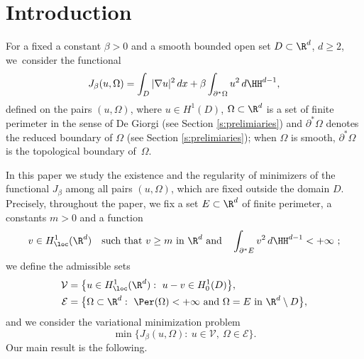 \section{Introduction}\label{s:intro}
For a fixed a constant $\beta>0$ and a smooth bounded open set $D\subset \R^d$, $d\ge 2$, we~consider the functional
\[J_\beta(u,\Omega)=\int_D|\nabla u|^2\,dx+\beta\int_{\partial^\ast \Omega}u^2\,d\HH^{d-1},\]
defined on the pairs $(u,\Omega)$, where $u\in H^1(D)$, $\Omega\subset\R^d$ is a set of finite perimeter in the sense of De Giorgi (see Section \ref{s:prelimiaries})
and $\partial^\ast\Omega$ denotes the reduced boundary of $\Omega$ (see Section \ref{s:prelimiaries}); when $\Omega$ is smooth, $\partial^\ast\Omega$ is the topological boundary of~$\Omega$.

In this paper we study the existence and the regularity of minimizers of the functional $J_\beta$
among all pairs $(u,\Omega)$, which are fixed outside the domain $D$. Precisely, throughout the paper, we fix a set $E\subset\R^d$ of finite perimeter, a constants $m>0$ and a function
\[v\in H^1_{\loc}(\R^d)\quad\text{such that $v\ge m$ in $\R^d$ and}\quad\int_{\partial^\ast E}v^2\,d\HH^{d-1}<+\infty\ ;\]
we define the admissible sets
\begin{align*}
\mathcal V&=\big\{u\in H^1_{\loc}(\R^d):\ u-v\in H^1_0(D)\big\},\\
\mathcal E&=\big\{\Omega\subset\R^d:\ \Per(\Omega)<+\infty\text{ and } \Omega=E \text{ in } \R^d\setminus D\big\},
\end{align*}
and we consider the variational minimization problem
\begin{equation}\label{e:pb}
\min\big\{J_\beta(u,\Omega):\ u\in\mathcal V,\ \Omega\in\mathcal E\big\}.
\end{equation}
Our main result is the following.

